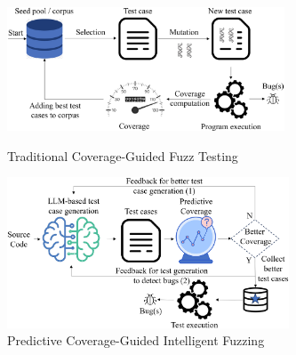 \begin{figure}[t]
    \centering
    \begin{minipage}{0.5\textwidth}
        \centering
        \includegraphics[width=3.25in]{coverage-fuzz.png}
        \vspace{-18pt}
        \caption{Traditional Coverage-Guided Fuzz Testing}
        \label{fig:coverage-fuzz}
    \end{minipage}%
    \begin{minipage}{0.5\textwidth}
        \centering
        \includegraphics[width=3.3in]{fuzzwise2.png}
        \vspace{-18pt}
        \caption{Predictive Coverage-Guided Intelligent Fuzzing}
        \label{fig:fuzzwise}
    \end{minipage}
\end{figure}



